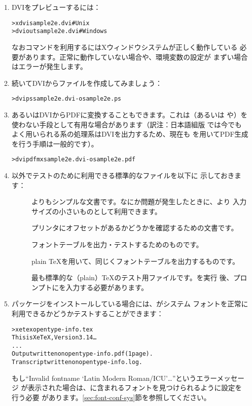 \documentclass[uplatex,dvipdfmx]{jsarticle}
\begin{document}
\begin{enumerate}
\item DVIをプレビューするには：
%
\begin{alltt}
> xdvi sample2e.dvi    # Unix
> dviout sample2e.dvi  # Windows
\end{alltt}
%
なおコマンドを利用するにはXウィンドウシステムが正しく動作している
必要があります。正常に動作していない場合や、環境変数の設定が
まずい場合はエラーが発生します。

\item 続いてDVIから\PS ファイルを作成してみましょう：
%
\begin{alltt}
> dvips sample2e.dvi -o sample2e.ps
\end{alltt}

\item あるいはDVIからPDFに変換することもできます。これは\pdfTeX （あるいは
\XeTeX や\LuaTeX）を使わない手段として有用な場合があります（訳注：日本語組版
では今でもよく用いられる\pTeX 系の処理系はDVIを出力するため、現在も
を用いてPDF生成を行う手順は一般的です）。
%
\begin{alltt}
> dvipdfmx sample2e.dvi -o sample2e.pdf
\end{alltt}

\item {}以外でテストのために利用できる標準的なファイルを以下に
示しておきます：
%
\begin{description}
\item []
よりもシンプルな文書です。なにか問題が発生したときに、より
入力サイズの小さいものとして利用できます。

\item []
プリンタにオフセットがあるかどうかを確認するための文書です。

\item []
フォントテーブルを出力・テストするためのものです。

\item []
plain \TeX を用いて、同じくフォントテーブルを出力するものです。

\item []
最も標準的な（plain）\TeX のテスト用ファイルです。を実行
後、\code{*}プロンプトにを入力する必要があります。
\end{description}

\item {}パッケージをインストールしている場合には、\XeTeX がシステム
フォントを正常に利用できるかどうかテストすることができます：
%
\begin{alltt}
> xetex opentype-info.tex
This is XeTeX, Version 3.14\dots
...
Output written on opentype-info.pdf (1 page).
Transcript written on opentype-info.log.
\end{alltt}
%
もし``Invalid fontname `Latin Modern Roman/ICU'\dots''というエラーメッセージ
が表示された場合は、\TL に含まれるフォントを見つけられるように設定を行う必要
があります。\ref{sec:font-conf-sys}節を参照してください。
\end{enumerate}
\end{document}
